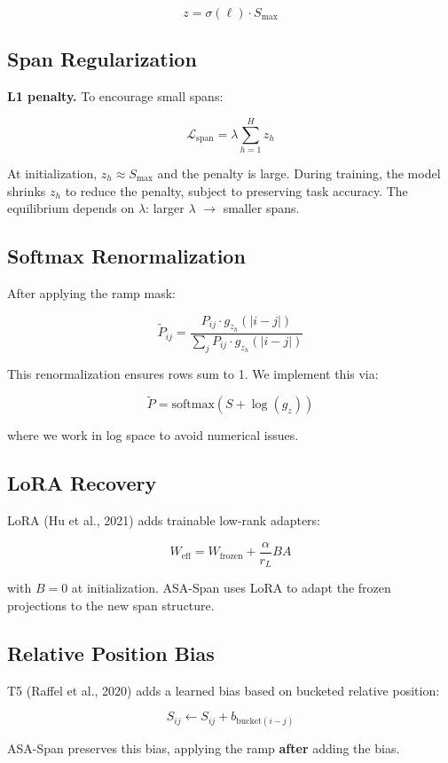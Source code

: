 \[
z = \sigma(\ell) \cdot S_\text{max}
\]

\subsection{Span Regularization}

\textbf{L1 penalty.} To encourage small spans:

\[
\mathcal{L}_\text{span} = \lambda \sum_{h=1}^H z_h
\]

At initialization, $z_h \approx S_\text{max}$ and the penalty is large. During 
training, the model shrinks $z_h$ to reduce the penalty, subject to preserving 
task accuracy. The equilibrium depends on $\lambda$: larger $\lambda$ $\to$ 
smaller spans.

\subsection{Softmax Renormalization}

After applying the ramp mask:

\[
\tilde{P}_{ij} = \frac{P_{ij} \cdot g_{z_h}(|i - j|)}{\sum_j P_{ij} \cdot g_{z_h}(|i - j|)}
\]

This renormalization ensures rows sum to 1. We implement this via:

\[
\tilde{P} = \text{softmax}(S + \log(g_z))
\]

where we work in log space to avoid numerical issues.

\subsection{LoRA Recovery}

LoRA (Hu et al., 2021) adds trainable low-rank adapters:

\[
W_\text{eff} = W_\text{frozen} + \frac{\alpha}{r_L} B A
\]

with $B = 0$ at initialization. ASA-Span uses LoRA to adapt the frozen 
projections to the new span structure.

\subsection{Relative Position Bias}

T5 (Raffel et al., 2020) adds a learned bias based on bucketed relative 
position:

\[
S_{ij} \leftarrow S_{ij} + b_{\text{bucket}(i - j)}
\]

ASA-Span preserves this bias, applying the ramp \textbf{after} adding the bias.

